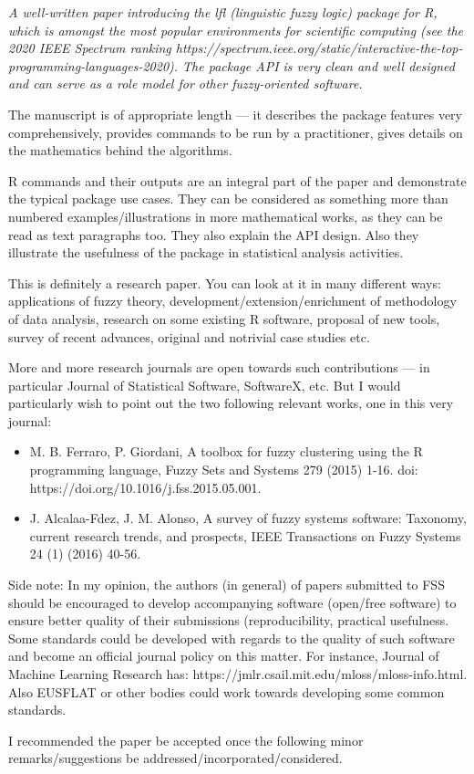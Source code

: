 \documentclass{article}
\begin{document}
{ \it A well-written paper introducing the lfl (linguistic fuzzy logic) package for R, which is amongst the most popular environments for scientific computing (see the 2020 IEEE Spectrum ranking https://spectrum.ieee.org/static/interactive-the-top-programming-languages-2020). The package API is very clean and well designed and can serve as a role model for other fuzzy-oriented software.

The manuscript is of appropriate length — it describes the package features very comprehensively, provides commands to be run by a practitioner, gives details on the mathematics behind the algorithms.

R commands and their outputs are an integral part of the paper and demonstrate the typical package use cases. They can be considered as something more than numbered examples/illustrations in more mathematical works, as they can be read as text paragraphs too. They also explain the API design.
Also they illustrate the usefulness of the package in statistical analysis activities.

This is definitely a research paper. You can look at it in many different ways: applications of fuzzy theory, development/extension/enrichment of methodology of data analysis, research on some existing R software, proposal of new tools, survey of recent advances, original and notrivial case studies etc.

More and more research journals are open towards such contributions — in particular Journal of Statistical Software, SoftwareX, etc. But I would particularly wish to point out the two following relevant works, one in this very journal:

\begin{itemize}
    \item  M. B. Ferraro, P. Giordani, A toolbox for fuzzy clustering using the R programming language, Fuzzy Sets and Systems 279 (2015) 1-16. doi: https://doi.org/10.1016/j.fss.2015.05.001.
    \item J. Alcalaa-Fdez, J. M. Alonso, A survey of fuzzy systems software: Taxonomy, current research trends, and prospects, IEEE Transactions on Fuzzy Systems 24 (1) (2016) 40-56.
\end{itemize}

Side note: In my opinion, the authors (in general) of papers submitted to FSS should be encouraged to develop accompanying software (open/free software) to ensure better quality of their submissions (reproducibility, practical usefulness. Some standards could be developed with regards to the quality of such software and become an official journal policy on this matter. For instance, Journal of Machine Learning Research has: https://jmlr.csail.mit.edu/mloss/mloss-info.html. Also EUSFLAT or other bodies could work towards developing some common standards.

I recommended the paper be accepted once the following minor remarks/suggestions be addressed/incorporated/considered.}
\end{document}
